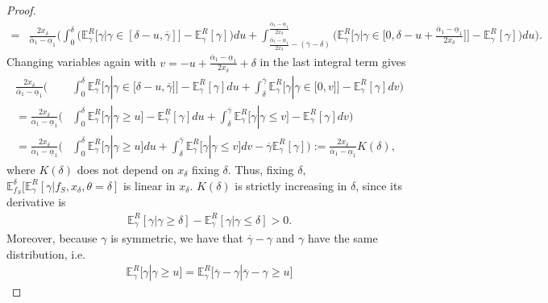 \documentclass[11pt,dvipsnames]{article}
\begin{document}
\begin{appendix}
\begin{proof}
\begin{align*}
=&\frac{2x_\delta}{\overline{\alpha}_1-\underline{\alpha}_1}\bigg(
\int_0^\delta \Big(\mathbb{E}_\gamma^R\big[\gamma| \gamma \in [\delta -u,\overline{\gamma}]\big]-\mathbb{E}_\gamma^R[\gamma]\Big)du
+\int_{\frac{\overline{\alpha}_1-\underline{\alpha}_1}{2x_\delta}-(\overline{\gamma}-\delta)}^{\frac{\overline{\alpha}_1-\underline{\alpha}_1}{2x_\delta}} \Big(\mathbb{E}_\gamma^R\Big[\gamma\Big| \gamma \in \Big[0,\delta -u+ \frac{\overline{\alpha}_1-\underline{\alpha}_1}{2x_\delta}\Big]\Big]-\mathbb{E}_\gamma^R[\gamma]\Big)du\bigg).
\end{align*}
Changing variables again with $v = -u +\frac{\overline{\alpha}_1-\underline{\alpha}_1}{2x_\delta}+\delta$ in the last integral term gives
\begin{align*}
\frac{2x_\delta}{{\overline{\alpha}_1-\underline{\alpha}_1}}\bigg(
&\int_0^\delta \mathbb{E}_\gamma^R\big[\gamma| \gamma \in \big[\delta -u,\overline{\gamma}]\big]-\mathbb{E}_\gamma^R[\gamma]du
+\int_{\delta}^{\overline{\gamma}} \mathbb{E}_\gamma^R\big[\gamma| \gamma \in \big[0,v]\big]-\mathbb{E}_\gamma^R[\gamma]dv\bigg)
\\
=\frac{2x_\delta}{{\overline{\alpha}_1-\underline{\alpha}_1}}\bigg(
&\int_0^\delta \mathbb{E}_\gamma^R\big[\gamma| \gamma \geq u\big]-\mathbb{E}_\gamma^R[\gamma]du
+\int_{\delta}^{\overline{\gamma}} \mathbb{E}_\gamma^R\big[\gamma| \gamma \leq v\big]-\mathbb{E}_\gamma^R[\gamma]dv\bigg)
\\
=\frac{2x_\delta}{{\overline{\alpha}_1-\underline{\alpha}_1}}\bigg(
&\int_0^\delta \mathbb{E}_\gamma^R\big[\gamma| \gamma \geq u\big]du
+\int_{\delta}^{\overline{\gamma}} \mathbb{E}_\gamma^R\big[\gamma| \gamma \leq v\big]dv-\overline{\gamma}\mathbb{E}_\gamma^R[\gamma]\bigg)
:= \frac{2x_\delta}{{\overline{\alpha}_1-\underline{\alpha}_1}}K(\delta),
\end{align*}
where $K(\delta)$ does not depend on $x_\delta$ fixing $\delta$.
Thus, fixing $\delta$, $\mathbb{E}_{f_S}^\delta\big[\mathbb{E}_\gamma^R[\gamma|f_S,x_\delta,\theta=\delta]$ is linear in $x_\delta$.
$K(\delta)$ is strictly increasing in $\delta$, since its derivative is 
\begin{align*}
\mathbb{E}_\gamma^R[\gamma|\gamma \geq \delta]-	\mathbb{E}_\gamma^R[\gamma|\gamma \leq \delta] > 0.
\end{align*}
Moreover, because $\gamma$ is symmetric, we have that $\overline{\gamma}-\gamma$ and $\gamma$ have the same distribution, i.e.
\begin{align*}
\mathbb{E}_\gamma^R\big[\gamma| \gamma \geq u\big]
=
\mathbb{E}_\gamma^R\big[\overline{\gamma}-\gamma| \overline{\gamma}-\gamma \geq u\big]

\end{align*}
\end{proof}
\end{appendix}
\end{document}
